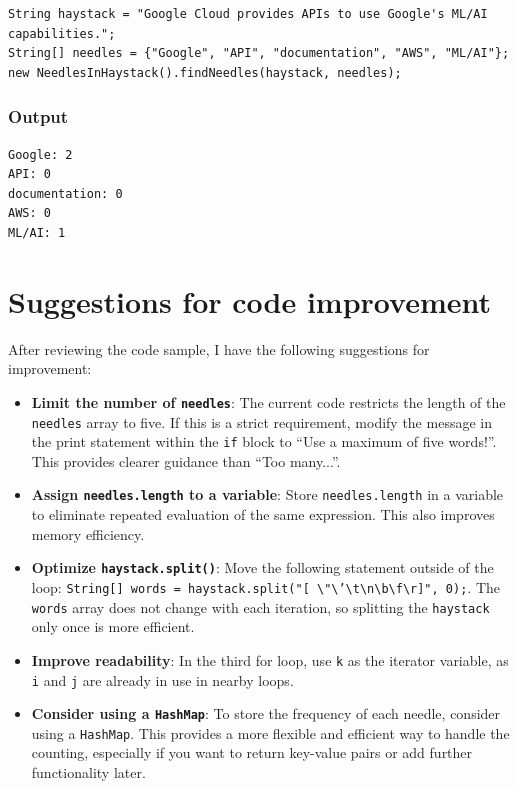\documentclass{article}
\begin{document}
\begin{lstlisting}[style=java]
String haystack = "Google Cloud provides APIs to use Google's ML/AI capabilities.";
String[] needles = {"Google", "API", "documentation", "AWS", "ML/AI"};
new NeedlesInHaystack().findNeedles(haystack, needles);
\end{lstlisting}

\subsubsection*{Output}

\begin{lstlisting}
Google: 2
API: 0
documentation: 0
AWS: 0
ML/AI: 1
\end{lstlisting}

\section*{Suggestions for code improvement}

After reviewing the code sample, I have the following suggestions for improvement:

\begin{itemize}
    \item \textbf{Limit the number of \texttt{needles}}: The current code restricts the length of the \texttt{needles} array to five. If this is a strict requirement, modify the message in the print statement within the \texttt{if} block to ``Use a maximum of five words!''. This provides clearer guidance than ``Too many...''.
    
    \item \textbf{Assign \texttt{needles.length} to a variable}: Store \texttt{needles.length} in a variable to eliminate repeated evaluation of the same expression. This also improves memory efficiency.
    
    \item \textbf{Optimize \texttt{haystack.split()}}: Move the following statement outside of the loop: \texttt{String[] words = haystack.split("[ \textbackslash"\textbackslash'\textbackslash t\textbackslash n\textbackslash b\textbackslash f\textbackslash r]", 0);}. The \texttt{words} array does not change with each iteration, so splitting the \texttt{haystack} only once is more efficient.
    
    \item \textbf{Improve readability}: In the third for loop, use \texttt{k} as the iterator variable, as \texttt{i} and \texttt{j} are already in use in nearby loops.
    
    \item \textbf{Consider using a \texttt{HashMap}}: To store the frequency of each needle, consider using a \texttt{HashMap}. This provides a more flexible and efficient way to handle the counting, especially if you want to return key-value pairs or add further functionality later.
\end{itemize}
\end{document}
